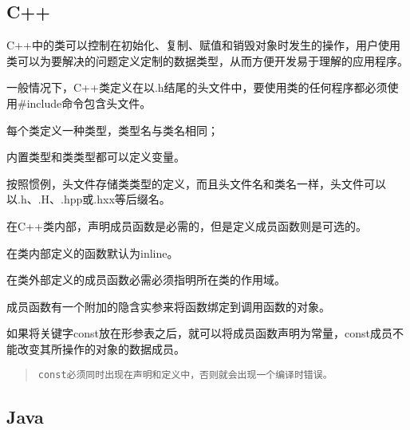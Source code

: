 \begin{lstlisting}[language=Oberon-2]

\end{lstlisting}




\begin{lstlisting}[language=Oberon-2]

\end{lstlisting}

\subsection{C++}

C++中的类可以控制在初始化、复制、赋值和销毁对象时发生的操作，用户使用类可以为要解决的问题定义定制的数据类型，从而方便开发易于理解的应用程序。

一般情况下，C++类定义在以.h结尾的头文件中，要使用类的任何程序都必须使用\#include命令包含头文件。

\begin{compactitem}
\item 每个类定义一种类型，类型名与类名相同；
\item 内置类型和类类型都可以定义变量。
\end{compactitem}

按照惯例，头文件存储类类型的定义，而且头文件名和类名一样，头文件可以以.h、.H、.hpp或.hxx等后缀名。

在C++类内部，声明成员函数是必需的，但是定义成员函数则是可选的。

\begin{compactitem}
\item 在类内部定义的函数默认为inline。
\item 在类外部定义的成员函数必需必须指明所在类的作用域。
\end{compactitem}

成员函数有一个附加的隐含实参来将函数绑定到调用函数的对象。

如果将关键字const放在形参表之后，就可以将成员函数声明为常量，const成员不能改变其所操作的对象的数据成员。

\begin{quote}
\texttt{const必须同时出现在声明和定义中，否则就会出现一个编译时错误。}
\end{quote}



\subsection{Java}



